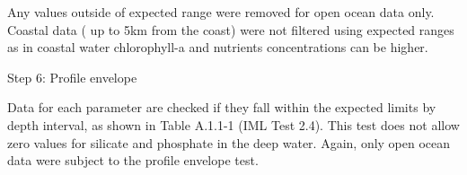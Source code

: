 \documentclass[letterpaper,portrait,12pt]{scrartcl}
\numberwithin{equation}{section}		%
\numberwithin{figure}{section}			%
\numberwithin{table}{section}				%
\begin{document}
Any values outside of expected range were removed for open ocean data only. Coastal data ( up to 5km from the coast) were not filtered using expected ranges as in coastal water chlorophyll-a and nutrients concentrations can be higher. 









Step 6: Profile envelope




Data  for each parameter are checked if they fall within the expected limits by depth interval, as shown in Table A.1.1-1 (IML Test 2.4). This test does not allow zero values for silicate and phosphate in the deep water. Again, only open ocean data were subject to the profile envelope test.
\end{document}
